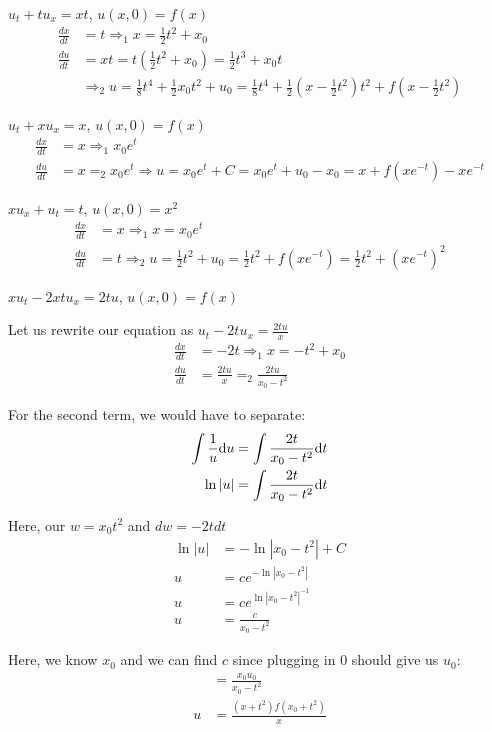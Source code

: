   \ex $u_t + tu_x = xt$, $u(x, 0) = f(x)$
  \begin{align}
    \frac{dx}{dt} & = t \Rightarrow_1 x = \frac{1}{2} t^2 + x_0\\
    \frac{du}{dt} & = xt = t\left(\frac{1}{2}t^2 + x_0\right)
    = \frac{1}{2} t^3 + x_0 t\\
    & \Rightarrow_2 u = \frac{1}{8} t^4 + \frac{1}{2} x_0 t^2 + u_0
    = \frac{1}{8} t^4 + \frac{1}{2} \left(x - \frac{1}{2} t^2\right)t^2 +
    f\left(x - \frac{1}{2} t^2 \right)
  \end{align}

  \ex $u_t + xu_x = x$, $u(x, 0) = f(x)$
  \begin{align}
    \frac{dx}{dt} & = x \Rightarrow_1 x_0 e^t\\
    \frac{du}{dt} & = x =_2 x_0e^t \Rightarrow u = x_0e^t + C
    = x_0 e^t + u_0 - x_0 = x + f(xe^{-t}) - xe^{-t}
  \end{align}

  \ex $xu_x + u_t = t$, $u(x, 0) = x^2$
  \begin{align}
    \frac{dx}{dt} & = x \Rightarrow_1 x = x_0 e^t\\
    \frac{du}{dt} & = t \Rightarrow_2 u = \frac{1}{2} t^2 + u_0
    = \frac{1}{2}t^2 + f\left(xe^{-t}\right)
    = \frac{1}{2}t^2 + \left(xe^{-t}\right)^2
  \end{align}

  \ex $xu_t - 2xtu_x = 2tu$, $u(x, 0) = f(x)$

  Let us rewrite our equation as $u_t - 2tu_x = \frac{2tu}{x}$
  \begin{align}
    \frac{dx}{dt} & = -2t \Rightarrow_1 x = -t^2 + x_0\\
    \frac{du}{dt} & = \frac{2tu}{x} =_2 \frac{2tu}{x_0 - t^2}
  \end{align}

  For the second term, we would have to separate:
  \begin{align}
    \int \frac{1}{u} \text du & = \int \frac{2t}{x_0 - t^2} \text dt\\
    \ln |u| & = \int \frac{2t}{x_0 - t^2} \text dt
  \end{align}

  Here, our $w = x_0 t^2$ and $dw = -2t dt$
  \begin{align}
    \ln |u| & = - \ln |x_0 - t^2| + C\\
    u & = ce^{-\ln|x_0 - t^2|}\\
    u & = ce^{\ln|x_0 - t^2|^{-1}}\\
    u & = \frac{c}{x_0 - t^2}
  \end{align}

  Here, we know $x_0$ and we can find $c$ since plugging in $0$ should give us
  $u_0$:
  \begin{align}
    & = \frac{x_0 u_0}{x_0 - t^2}\\
    u & = \frac{(x + t^2) f(x_0 + t^2)}{x}
  \end{align}
